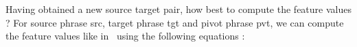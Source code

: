 \begin{comment}
Facing a new low resource language pair, several questions arise when trying to use triangulation. 

\begin{itemize}\addtolength{\itemsep}{-0.4\baselineskip}
        \item How large should the triangulated table be?
        \item What is the best way to compute feature values in the triangulated phrase table?
        \item When combining with the direct system, do we use linear interpolation or alternative decoding paths?
        \item Is the approach of cascading a viable option?
        \item How does one penalize triangulated phrase pairs with insufficient alignment between the words in the phrase pairs?
\end{itemize}


All the papers that use triangulation in machine translation cite either \cite{Utiyama:07} or \cite{Cohn:07}, both published in 2007 (and sometimes cite both of them but use either one model or the other). However, these two papers introduce triangulation for phrase-based SMT in very different ways and their models are different from each other. To our knowledge, before this paper there has been no in-depth study of the different choices in building an SMT system using triangulation. Another limitation of the original work in triangulation~\cite{Utiyama:07,Cohn:07} is the unrealistic use of languages with abundant parallel data to simulate low-resource languages. Subsequent work~\cite{Nakov:12,Nakovemnlp:12,Gispert:06,Huck:12} has also assumed that parallel data in pivot languages can be found in the same domain as the original resource-poor language pair. This kind of domain similarity is not easy to find for realistic low-resource settings. In this paper, we consider and answer these design issues for real-world low-resource language pairs, building an effective machine translation for some of these languages for the first time. In constrast, in this dissertation, we improve translation quality by using triangulation through careful consideration of the triangulation design options listed above. Furthermore, in all four languages since the low-resource language pair and pivot language pair data typically come from very different domains, we use insights from domain adaptation to fine-tune the weighted mixture of direct and pivot based phrase pairs to significantly improve translation quality. 

\end{comment}
Having obtained a new source target pair, how best to compute the feature values ? For source phrase src, target phrase tgt and pivot phrase pvt, we can compute the feature values like in~\cite{Utiyama:07} using the following equations : 

